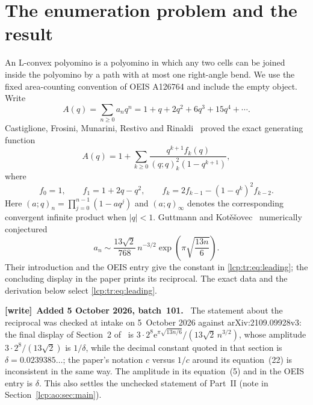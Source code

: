 \documentclass[11pt]{article}
\numberwithin{equation}{section}
\theoremstyle{definition}\newtheorem{definition}[theorem]{Definition}
\theoremstyle{remark}\newtheorem{remark}[theorem]{Remark}
\newcommand{\ee}{\mathrm e}
\newenvironment{writenote}[1][]{\par\smallskip\begingroup\small
 \noindent\textbf{[write]}\if\relax\detokenize{#1}\relax\else~\textbf{#1.}\fi\ }%
 {\par\endgroup\smallskip}
\begin{document}
\section{The enumeration problem and the result}\label{lcp:tr:sec:main}
An L-convex polyomino is a polyomino in which any two cells can be joined inside the polyomino by a path with at most one right-angle bend. We use the fixed area-counting convention of OEIS A126764 and include the empty object. Write
\[
 A(q)=\sum_{n\ge0}a_nq^n=1+q+2q^2+6q^3+15q^4+\cdots.
\]
Castiglione, Frosini, Munarini, Restivo and Rinaldi~\cite{castiglione} proved the exact generating function
\begin{equation}\label{lcp:tr:eq:original}
 A(q)=1+\sum_{k\ge0}\frac{q^{k+1}f_k(q)}{(q;q)_k^2(1-q^{k+1})},
\end{equation}
where
\begin{equation}\label{lcp:tr:eq:frec}
 f_0=1,\qquad f_1=1+2q-q^2,\qquad
 f_k=2f_{k-1}-(1-q^k)^2f_{k-2}.
\end{equation}
Here $(a;q)_n=\prod_{j=0}^{n-1}(1-aq^j)$ and $(a;q)_\infty$ denotes the corresponding convergent infinite product when $|q|<1$.
Guttmann and Kot\v e\v sovec~\cite{gk} numerically conjectured
\begin{equation}\label{lcp:tr:eq:leading}
 a_n\sim\frac{13\sqrt2}{768}\,n^{-3/2}
       \exp\!\left(\pi\sqrt{\frac{13n}{6}}\right).
\end{equation}
Their introduction and the OEIS entry give the constant in \eqref{lcp:tr:eq:leading}; the concluding display in the paper prints its reciprocal. The exact data and the derivation below select \eqref{lcp:tr:eq:leading}.

\begin{writenote}[Added 5 October 2026, batch~101]
The statement about the reciprocal was checked at intake on 5~October 2026
against arXiv:2109.09928v3: the final display of Section~2 of~\cite{gk} is
$3\cdot2^8\ee^{\pi\sqrt{13n/6}}/(13\sqrt2\,n^{3/2})$, whose amplitude
$3\cdot2^8/(13\sqrt2)$ is $1/\delta$, while the decimal constant
quoted in that section is $\delta=0.0239385\ldots$; the paper's notation
$c$ versus $1/c$ around its equation~(22) is inconsistent in the same way.
The amplitude in its equation~(5) and in the OEIS entry is $\delta$. This
also settles the unchecked statement of Part~II (note in
Section~\ref{lcp:ao:sec:main}).
\end{writenote}
\end{document}
